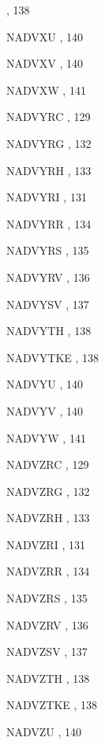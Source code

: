\begin{theindex}
    \subitem {},  138
  \item NADVXU
    \subitem {},  140
  \item NADVXV
    \subitem {},  140
  \item NADVXW
    \subitem {},  141
  \item NADVYRC
    \subitem {},  129
  \item NADVYRG
    \subitem {},  132
  \item NADVYRH
    \subitem {},  133
  \item NADVYRI
    \subitem {},  131
  \item NADVYRR
    \subitem {},  134
  \item NADVYRS
    \subitem {},  135
  \item NADVYRV
    \subitem {},  136
  \item NADVYSV
    \subitem {},  137
  \item NADVYTH
    \subitem {},  138
  \item NADVYTKE
    \subitem {},  138
  \item NADVYU
    \subitem {},  140
  \item NADVYV
    \subitem {},  140
  \item NADVYW
    \subitem {},  141
  \item NADVZRC
    \subitem {},  129
  \item NADVZRG
    \subitem {},  132
  \item NADVZRH
    \subitem {},  133
  \item NADVZRI
    \subitem {},  131
  \item NADVZRR
    \subitem {},  134
  \item NADVZRS
    \subitem {},  135
  \item NADVZRV
    \subitem {},  136
  \item NADVZSV
    \subitem {},  137
  \item NADVZTH
    \subitem {},  138
  \item NADVZTKE
    \subitem {},  138
  \item NADVZU
    \subitem {},  140

\end{theindex}
